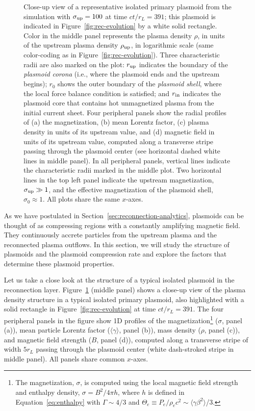 \begin{figure}[htb]
    {
        \caption{Close-up view of a representative isolated primary plasmoid from the simulation with $\sigma_{\rm up}=100$ at time $ct/r_L=391$; this plasmoid is indicated in Figure~\ref{fig:rec-evolution} by a white solid rectangle. Color in the middle panel represents the plasma density $\rho$, in units of the upstream plasma density $\rho_{\rm up}$, in logarithmic scale (same color-coding as in Figure~\ref{fig:rec-evolution}). Three characteristic radii are also marked on the plot: $r_{\rm up}$ indicates the boundary of the {\it plasmoid corona} (i.e., where the plasmoid ends and the upstream begins); $r_0$ shows the outer boundary of the {\it plasmoid shell}, where the local force balance condition is satisfied; and $r_{\rm in}$ indicates the plasmoid core that contains hot unmagnetized plasma from the initial current sheet. Four peripheral panels show the radial profiles of (a) the magnetization, (b) mean Lorentz factor, (c) plasma density in units of its upstream value, and (d) magnetic field in units of its upstream value, computed along a transverse stripe passing through the plasmoid center (see horizontal dashed white lines in middle panel). In all peripheral panels, vertical lines indicate the characteristic radii marked in the middle plot. Two horizontal lines in the top left panel indicate the upstream magnetization, $\sigma_{\rm up} \gg 1$, and the effective magnetization of the plasmoid shell, $\sigma_0 \approx 1$. All plots share the same $x$-axes.}
        \label{fig:rec-plasm_example}
        }
\end{figure}

As we have postulated in Section~\ref{sec:reconnection-analytics}, plasmoids can be thought of as compressing regions with a constantly amplifying magnetic field. They continuously accrete particles from the upstream plasma and the reconnected plasma outflows. In this section, we will study the structure of plasmoids and the plasmoid compression rate and explore the factors that determine these plasmoid properties. 

Let us take a close look at the structure of a typical isolated plasmoid in the reconnection layer. Figure~\ref{fig:rec-plasm_example} (middle panel) shows a close-up view of the plasma density structure in a typical isolated primary plasmoid, also highlighted with a solid rectangle in Figure~\ref{fig:rec-evolution} at time $ct/r_L = 391$. The four peripheral panels in the figure show 1D profiles of the magnetization\footnote{
The magnetization, $\sigma$, is computed using the local {magnetic field strength and} enthalpy density, $\sigma = B^2 / 4\pi h$, where  $h$ is defined in Equation~\eqref{eq:enthalpy} with $\Gamma\sim 4/3$ and $\Theta_e\equiv P_e/\rho_ec^2 \sim \langle\gamma\beta^2\rangle$/3.}
($\sigma$, panel (a)), mean particle Lorentz factor ($\langle\gamma\rangle$, panel (b)), mass density ($\rho$, panel (c)), and magnetic field strength ($B$, panel (d)), computed along a transverse stripe of width $5r_L$ passing through the plasmoid center (white dash-stroked stripe in middle panel). 
All panels share common $x$-axes. 

